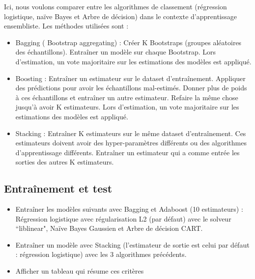 \documentclass[12pt, a4paper]{article}
\begin{document}
Ici, nous voulons comparer entre les algorithmes de classement (régression logistique, naïve Bayes et Arbre de décision) dans le contexte d'apprentissage ensembliste.
Les méthodes utilisées sont : 
\begin{itemize}
	\item Bagging ( Bootstrap aggregating) : Créer K Bootstraps (groupes aléatoires des échantillons). 
	Entraîner un modèle sur chaque Bootstrap.
	Lors d'estimation, un vote majoritaire sur les estimations des modèles est appliqué.
	\item Boosting : Entraîner un estimateur sur le dataset d'entraînement. 
	Appliquer des prédictions pour avoir les échantillons mal-estimés.
	Donner plus de poids à ces échantillons et entraîner un autre estimateur.
	Refaire la même chose jusqu'à avoir K estimateurs.
	Lors d'estimation, un vote majoritaire sur les estimations des modèles est appliqué.
	\item Stacking : Entraîner K estimateurs sur le même dataset d'entraînement.
	Ces estimateurs doivent avoir des hyper-paramètres différents ou des algorithmes d'apprentissage différents.
	Entraîner un estimateur qui a comme entrée les sorties des autres K estimateurs.
\end{itemize}

\subsection{Entraînement et test}

\begin{itemize}
	\item Entraîner les modèles suivants avec Bagging et Adaboost (10 estimateurs) : Régression logistique avec régularisation L2 (par défaut) avec le solveur ``liblinear", Naïve Bayes Gaussien et Arbre de décision CART.
	\item Entraîner un modèle avec Stacking (l'estimateur de sortie est celui par défaut : régression logistique) avec les 3 algorithmes précédents.
	\item Afficher un tableau qui résume ces critères
\end{itemize}
\end{document}

